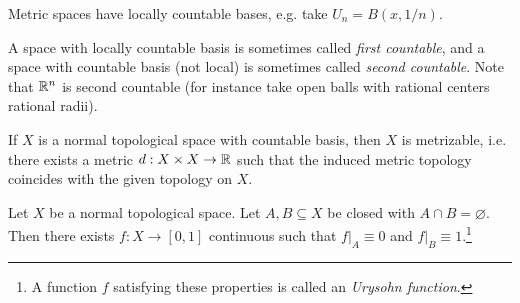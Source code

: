 \begin{remark}
  Metric spaces have locally countable bases, e.g.
  take $U_n = B(x, 1 / n)$.
\end{remark}

\begin{remark}
  A space with locally countable basis is
  sometimes called \emph{first countable}, and a space
  with countable basis (not local) is sometimes
  called \emph{second countable}. Note that
  $\mathbb{R}^n$ is second countable (for instance
  take open balls with rational centers rational
  radii).
\end{remark}

\begin{theorem}
  If $X$ is a normal topological space with
  countable basis, then $X$ is metrizable,
  i.e. there exists a metric $d : X \times X \to \mathbb{R}$
  such that the induced metric topology coincides
  with the given topology on $X$.
\end{theorem}

\begin{lemma}
  Let $X$ be a normal topological space. Let
  $A, B \subseteq X$ be closed with $A \cap B = \varnothing$.
  Then there exists $f : X \to [0, 1]$ continuous
  such that $f|_A \equiv 0$ and $f|_B \equiv 1$.\footnote{A function $f$ satisfying these properties is called an \emph{Urysohn function}.}
\end{lemma}

